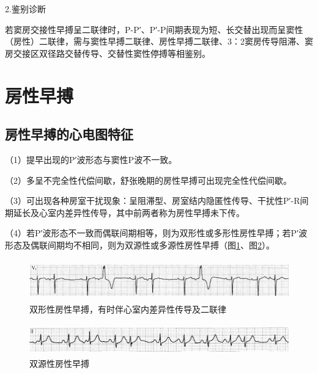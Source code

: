 2.鉴别诊断

若窦房交接性早搏呈二联律时，P-P′、P′-P间期表现为短、长交替出现而呈窦性（房性）二联律，需与窦性早搏二联律、房性早搏二联律、3：2窦房传导阻滞、窦房交接区双径路交替传导、交替性窦性停搏等相鉴别。

\protect\hypertarget{text00018.htmlux5cux23subid134}{}{}

\section{房性早搏}

\protect\hypertarget{text00018.htmlux5cux23subid135}{}{}

\subsection{房性早搏的心电图特征}

（1）提早出现的P′波形态与窦性P波不一致。

（2）多呈不完全性代偿间歇，舒张晚期的房性早搏可出现完全性代偿间歇。

（3）可出现各种房室干扰现象：呈阻滞型、房室结内隐匿性传导、干扰性P′-R间期延长及心室内差异性传导，其中前两者称为房性早搏未下传。

（4）若P′波形态不一致而偶联间期相等，则为双形性或多形性房性早搏；若P′波形态及偶联间期均不相同，则为双源性或多源性房性早搏（图\ref{fig11-4}、图\ref{fig11-5}）。

\begin{figure}[!htbp]
 \centering
 \includegraphics[width=5.78125in,height=0.69792in]{./images/Image00156.jpg}
 \captionsetup{justification=centering}
 \caption{双形性房性早搏，有时伴心室内差异性传导及二联律}
 \label{fig11-4}
  \end{figure} 

\begin{figure}[!htbp]
 \centering
 \includegraphics[width=5.78125in,height=0.53125in]{./images/Image00157.jpg}
 \captionsetup{justification=centering}
 \caption{双源性房性早搏}
 \label{fig11-5}
  \end{figure} 

